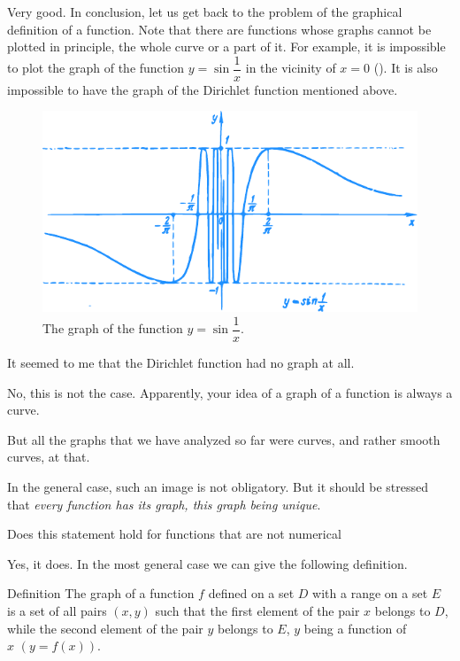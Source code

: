 {\athr Very good. In conclusion, let us get back to the problem of the graphical definition of a function. Note that there are functions whose graphs cannot be plotted in principle, the whole curve or a part of it. For example, it is impossible to plot the graph of the function $y= \sin \dfrac{1}{x}$ in the vicinity of $x = 0$ (). It is also impossible to have the graph of the Dirichlet	function mentioned above.
\begin{figure}[!ht]%
\centering
\includegraphics[width=\textwidth]{figures/fig-24.pdf}
\caption{The graph of the function $y = \sin \dfrac{1}{x}$.}
\label{fig-24}
\end{figure}

\rdr It seemed to me that the Dirichlet function had no graph at all. 

\athr No, this is not the case. Apparently, your idea of a graph of a function is always a curve.

\rdr But all the graphs that we have analyzed so far were curves, and rather smooth curves, at that.

\athr In the general case, such an image is not obligatory. But it should be stressed that \emph{every function has its graph, this graph being unique}.

\rdr Does this statement hold for functions that are not numerical

\athr Yes, it does. In the most general case we can give the following definition.
\begin{mytheo}{Definition}
The graph of a function $f$ defined on a set $D$ with a range on a set $E$ is a set of all pairs $(x, y)$ such that the first element of the pair $x$ belongs to $D$, while the second element of the pair $y$ belongs to $E$, $y$ being a function of $x \,\, (y= f(x))$.
\end{mytheo}

}
